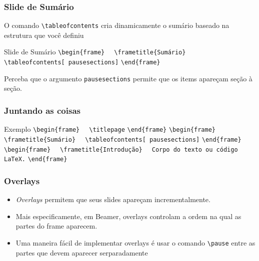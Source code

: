 \begin{frame}[fragile]
\frametitle{Slide de Sumário}
O comando \verb|\tableofcontents| cria dinamicamente o sumário baseado na estrutura que você
definiu
 
\begin{block}{Slide de Sumário}
\scriptsize
	\verb|\begin{frame}|\newline
	\verb|  \frametitle{Sumário}|\newline
  	\verb|  \tableofcontents[ pausesections]|\newline
	\verb|\end{frame}|
\end{block}

Perceba que o argumento \texttt{pausesections} permite que os items apareçam seção à seção.
\end{frame}

\begin{frame}[fragile]
\frametitle{Juntando as coisas}
 
\begin{block}{Exemplo}
\scriptsize
	\verb|\begin{frame}|\newline
	\verb|  \titlepage|\newline
	\verb|\end{frame}|
	\newline
	\verb|\begin{frame}|\newline
	\verb|  \frametitle{Sumário}|\newline
  	\verb|  \tableofcontents[ pausesections]|\newline
	\verb|\end{frame}|\newline
	\newline
 	\verb|\begin{frame}|\newline
	\verb|  \frametitle{Introdução}|\newline
  	\verb|  Corpo do texto ou código LaTeX.|\newline
	\verb|\end{frame}|
\end{block}

\end{frame}


\begin{frame}[fragile]
\frametitle{Overlays}
\begin{itemize}
  \item \textit{Overlays} permitem que seus slides apareçam incrementalmente.
  \item Mais especificamente, em Beamer, \textcolor{darkcerulean}{overlays} controlam a ordem na
  qual as partes do frame aparecem.
  \item Uma maneira fácil de implementar overlays é usar o comando \verb|\pause| entre as partes que
  devem aparecer serparadamente
\end{itemize}
\end{frame}


